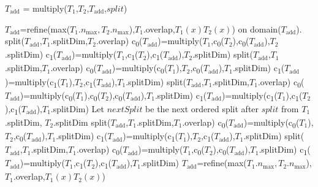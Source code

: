 \documentclass{article}
\newcommand{\nmax}{n_{\text{max}}}
\newcommand{\child}[1]{c\textsubscript{#1}}
\begin{document}
\begin{algorithm}[!h]
\caption{$T_{\mbox{add}}$ = multiply($T_1$,$T_2$,$T_{\mbox{add}}$,$split$)}
\label{addition2}
\begin{algorithmic}
\STATE $T_{\mbox{add}}$=refine(max($T_1.\nmax,T_2.\nmax$),$T_1$.overlap,$T_1(x)T_2(x)$) on domain($T_{\mbox{add}}$).
\STATE split($T_{\mbox{add}}$,$T_1$.splitDim,$T_2$.overlap)
\STATE \child{0}($T_{\mbox{add}}$)=multiply($T_1$,\child{0}($T_2$),\child{0}($T_{\mbox{add}}$),$T_2$.splitDim)
\STATE \child{1}($T_{\mbox{add}}$)=multiply($T_1$,\child{1}($T_2$),\child{1}($T_{\mbox{add}}$),$T_2$.splitDim)
\STATE split($T_{\mbox{add}}$,$T_1$.splitDim,$T_1$.overlap)
\STATE \child{0}($T_{\mbox{add}}$)=multiply(\child{0}($T_1$),$T_2$,\child{0}($T_{\mbox{add}}$),$T_1$.splitDim)
\STATE \child{1}($T_{\mbox{add}}$)=multiply(\child{1}($T_1$),$T_2$,\child{1}($T_{\mbox{add}}$),$T_1$.splitDim)
\STATE split($T_{\mbox{add}}$,$T_1$.splitDim,$T_1$.overlap)
\STATE \child{0}($T_{\mbox{add}}$)=multiply(\child{0}($T_1$),\child{0}($T_2$),\child{0}($T_{\mbox{add}}$),$T_1$.splitDim)
\STATE \child{1}($T_{\mbox{add}}$)=multiply(\child{1}($T_1$),\child{1}($T_2$),\child{1}($T_{\mbox{add}}$),$T_1$.splitDim)
\ELSE
\STATE Let $nextSplit$ be the next ordered split after $split$ from $T_1$.splitDim, $T_2$.splitDim
\STATE split($T_{\mbox{add}}$,$T_1$.splitDim,$T_1$.overlap)
\STATE \child{0}($T_{\mbox{add}}$)=multiply(\child{0}($T_1$),$T_2$,\child{0}($T_{\mbox{add}}$),$T_1$.splitDim)
\STATE \child{1}($T_{\mbox{add}}$)=multiply(\child{1}($T_1$),$T_2$,\child{1}($T_{\mbox{add}}$),$T_1$.splitDim)
\STATE split($T_{\mbox{add}}$,$T_1$.splitDim,$T_1$.overlap)
\STATE \child{0}($T_{\mbox{add}}$)=multiply($T_1$,\child{0}($T_2$),\child{0}($T_{\mbox{add}}$),$T_1$.splitDim)
\STATE \child{1}($T_{\mbox{add}}$)=multiply($T_1$,\child{1}($T_2$),\child{1}($T_{\mbox{add}}$),$T_1$.splitDim)
\ELSE
\STATE $T_{\mbox{add}}$=refine(max($T_1.\nmax,T_2.\nmax$),$T_1$.overlap,$T_1(x)T_2(x)$)
\ENDIF
\ENDIF
\end{algorithmic}
\end{algorithm}



\end{document}
